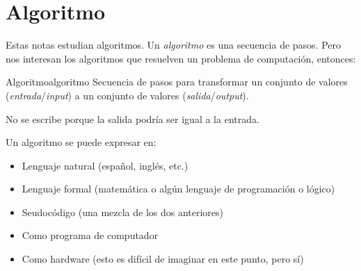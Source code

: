 \section{Algoritmo}

Estas notas estudian algoritmos. Un \emph{algoritmo} es una secuencia de pasos. Pero nos interesan los algoritmos que resuelven un problema de computación, entonces:

\begin{definicion}{Algoritmo}{algoritmo}
Secuencia de pasos para transformar un conjunto de valores (\emph{entrada}/\emph{\textit{input}}) a un conjunto de valores (\emph{salida}/\emph{\textit{output}}).
\end{definicion}
No se escribe  porque la salida podría ser igual a la entrada.

Un algoritmo se puede expresar en:
\begin{itemize}
  \item Lenguaje natural (español, inglés, etc.)
  \item Lenguaje formal (matemática o algún lenguaje de programación o lógico)
  \item Seudocódigo (una mezcla de los dos anteriores)
  \item Como programa de computador
  \item Como hardware (esto es difícil de imaginar en este punto, pero sí)
\end{itemize}
